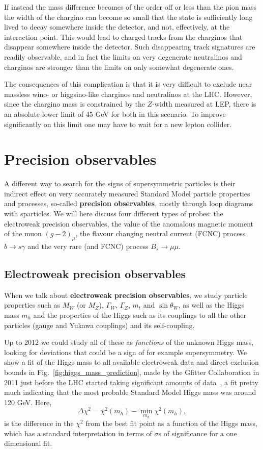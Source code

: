 \documentclass[notes.tex]{subfiles}
\begin{document}
If instead the mass difference becomes of the order off or less than the pion mass the width of the chargino can become so small that the state is sufficiently long lived to decay somewhere inside the detector, and not, effectively, at the interaction point. This would lead to charged tracks from the charginos that disappear somewhere inside the detector. Such disappearing track signatures are readily observable, and in fact the limits on very degenerate neutralinos and charginos are stronger than the limits on only somewhat degenerate ones.

The consequences of this complication is that it is very difficult to exclude near massless wino- or higgsino-like charginos and neutralinos at the LHC. However, since the chargino mass is constrained by the $Z$-width measured at LEP, there is an absolute lower limit of 45 GeV for both in this scenario. To improve significantly on this limit one may have to wait for a new lepton collider.


\section{Precision observables}
A different way to search for the signs of supersymmetric particles is their indirect effect on very accurately measured Standard Model particle properties and processes, so-called {\bf precision observables}, mostly through loop diagrams with sparticles. We will here discuss four different types of probes: the electroweak precision observables, the value of the anomalous magnetic moment of the muon $(g-2)_\mu$, the flavour changing neutral current (FCNC) process $b\to s\gamma$ and the very rare (and FCNC) process $B_s\to\mu\mu$.

\subsection{Electroweak precision observables}
When we talk about {\bf electroweak precision observables}, we study particle properties such as $M_W$ (or $M_Z$), $\Gamma_W$, $\Gamma_Z$, $m_t$ and $\sin\theta_W$, as well as the Higgs mass $m_h$ and the properties of the Higgs such as its couplings to all the other particles (gauge and Yukawa couplings) and its self-coupling. 

Up to 2012 we could study all of these as {\it functions} of the unknown Higgs mass, looking for deviations that could be a sign of for example supersymmetry. We show a fit of the Higgs mass to all available electroweak data and direct exclusion bounds in Fig.~\ref{fig:higgs_mass_prediction}, made by the Gfitter Collaboration in 2011 just before the LHC started taking significant amounts of data~\cite{Baak:2011ze}, a fit pretty much indicating that the most probable Standard Model Higgs mass was around 120 GeV.  Here, 
\[
\Delta\chi^2=\chi^2(m_h)-\min_{m_h}\chi^2(m_h),
\]
is the difference in the $\chi^2$ from the best fit point as a function of the Higgs mass, which has a standard interpretation in terms of $\sigma$s of significance for a one dimensional fit.
\end{document}
